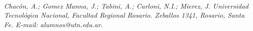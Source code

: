 \documentclass[12pt,a4paper,twocolumn]{article}
\begin{document}
\vspace{1.5em}

\\
{\fontsize{10}{12}\selectfont\itshape 
Chacón, A.; Gomez Manna, J.; Tabini, A.; Carloni, N.I.; Mierez, J. Universidad Tecnológica Nacional, Facultad Regional Rosario. Zeballos 1341, Rosario, Santa Fe. E-mail: alumnos@utn.edu.ar.
\par}
\end{document}
